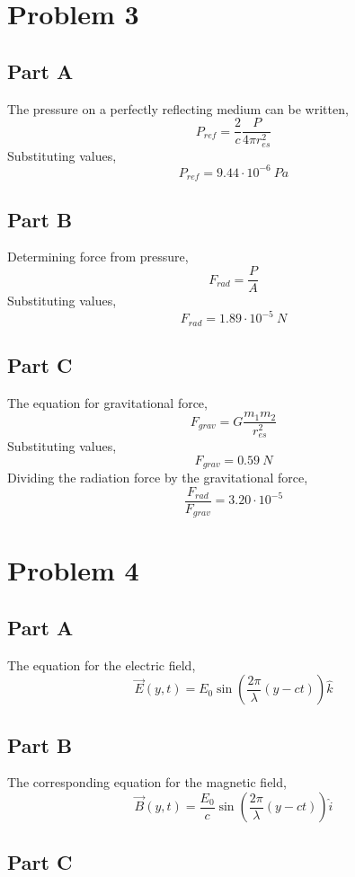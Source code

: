 \documentclass{article}
\begin{document}
\section*{Problem 3}

\subsection*{Part A}

The pressure on a perfectly reflecting medium can be written,
$$ P_{ref} = \frac{2}{c} \frac{P}{4 \pi r_{es}^2} $$
Substituting values,
$$ P_{ref} = 9.44 \cdot 10^{-6}\ \si{Pa} $$

\subsection*{Part B}

Determining force from pressure,
$$ F_{rad} = \frac{P}{A} $$
Substituting values,
$$ F_{rad} = 1.89 \cdot 10^{-5}\ \si{N} $$

\subsection*{Part C}

The equation for gravitational force,
$$ F_{grav} = G \frac{m_1 m_2}{r_{es}^2} $$
Substituting values,
$$ F_{grav} = 0.59\ \si{N} $$
Dividing the radiation force by the gravitational force,
$$ \frac{F_{rad}}{F_{grav}} = 3.20 \cdot 10^{-5} $$

\section*{Problem 4}

\subsection*{Part A}

The equation for the electric field,
$$ \vec{E}(y, t) = E_0 \sin\left( \frac{2 \pi}{\lambda} \left(y - ct
\right)\right) \hat{k} $$

\subsection*{Part B}

The corresponding equation for the magnetic field,
$$ \vec{B}(y, t) = \frac{E_0}{c} \sin \left( \frac{2 \pi}{\lambda} \left(y -
ct\right)\right) \hat{i} $$

\subsection*{Part C}
\end{document}
